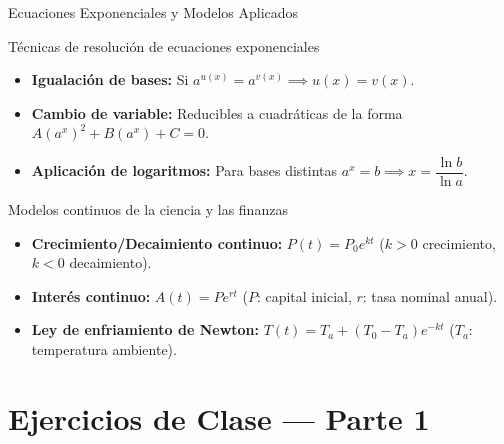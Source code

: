 \documentclass[aspectratio=169]{beamer}
\begin{document}
\begin{frame}{Ecuaciones Exponenciales y Modelos Aplicados}
  \begin{block}{Técnicas de resolución de ecuaciones exponenciales}
    \begin{itemize}
      \item \textbf{Igualación de bases:} Si $a^{u(x)} = a^{v(x)} \implies u(x) = v(x)$.
      \item \textbf{Cambio de variable:} Reducibles a cuadráticas de la forma $A(a^x)^2 + B(a^x) + C = 0$.
      \item \textbf{Aplicación de logaritmos:} Para bases distintas $a^x = b \implies x = \dfrac{\ln b}{\ln a}$.
    \end{itemize}
  \end{block}

  \vspace{4pt}
  \begin{block}{Modelos continuos de la ciencia y las finanzas}
    \begin{itemize}
      \item \textbf{Crecimiento/Decaimiento continuo:} $P(t) = P_0 e^{kt}$ ($k > 0$ crecimiento, $k < 0$ decaimiento).
      \item \textbf{Interés continuo:} $A(t) = P e^{rt}$ \qquad ($P$: capital inicial, $r$: tasa nominal anual).
      \item \textbf{Ley de enfriamiento de Newton:} $T(t) = T_a + (T_0 - T_a)e^{-kt}$ ($T_a$: temperatura ambiente).
    \end{itemize}
  \end{block}
\end{frame}



\section{Ejercicios de Clase — Parte 1}
\end{document}
